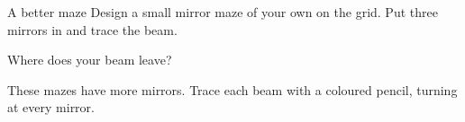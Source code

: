 \begin{puzzle}{A better maze}
Design a small mirror maze of your own on the grid. Put three mirrors in and trace the beam.
\begin{center}
\end{center}
Where does your beam leave? \wline[2cm]
\end{puzzle}
\clearpage

These mazes have more mirrors. Trace each beam with a coloured pencil, turning at every mirror.

